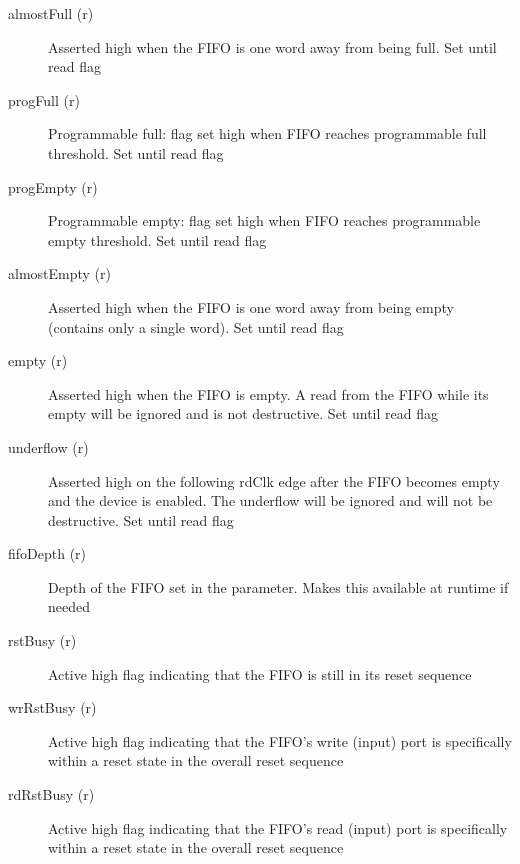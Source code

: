 \documentclass[11pt]{article}
\begin{document}
\begin{description}
	\item[almostFull (r)]Asserted high when the FIFO is one word away from being full. Set until read flag
	\item[progFull (r)]Programmable full: flag set high when FIFO reaches programmable full threshold. Set until read flag
	\item[progEmpty (r)]Programmable empty: flag set high when FIFO reaches programmable empty threshold. Set until read flag
	\item[almostEmpty (r)]Asserted high when the FIFO is one word away from being empty (contains only a single word). Set until read flag
	\item[empty (r)]Asserted high when the FIFO is empty. A read from the FIFO while its empty will be ignored and is not destructive. Set until read flag
	\item[underflow (r)]Asserted high on the following rdClk edge after the FIFO becomes empty and the device is enabled. The underflow will be ignored
		and will not be destructive. Set until read flag
	\item[fifoDepth (r)]Depth of the FIFO set in the parameter. Makes this available at runtime if needed
	\item[rstBusy (r)]Active high flag indicating that the FIFO is still in its reset sequence
	\item[wrRstBusy (r)]Active high flag indicating that the FIFO's write (input) port is specifically within a reset state in the overall reset sequence
	\item[rdRstBusy (r)]Active high flag indicating that the FIFO's read (input) port is specifically within a reset state in the overall reset sequence
\end{description}
\end{document}

